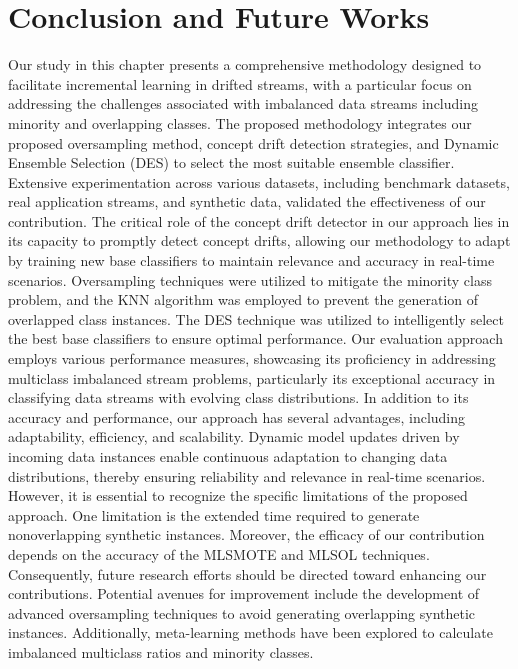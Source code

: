 %
%


\section{Conclusion and Future Works}
\label{sec:4_8_Conclusions}

Our study in this chapter presents a comprehensive methodology designed to facilitate incremental learning in drifted streams, with a particular focus on addressing the challenges associated with imbalanced data streams including minority and overlapping classes. The proposed methodology integrates our proposed oversampling method, concept drift detection strategies, and Dynamic Ensemble Selection (DES) to select the most suitable ensemble classifier. Extensive experimentation across various datasets, including benchmark datasets, real application streams, and synthetic data, validated the effectiveness of our contribution. The critical role of the concept drift detector in our approach lies in its capacity to promptly detect concept drifts, allowing our methodology to adapt by training new base classifiers to maintain relevance and accuracy in real-time scenarios. Oversampling techniques were utilized to mitigate the minority class problem, and the KNN algorithm was employed to prevent the generation of overlapped class instances. The DES technique was utilized to intelligently select the best base classifiers to ensure optimal performance. Our evaluation approach employs various performance measures, showcasing its proficiency in addressing multiclass imbalanced stream problems, particularly its exceptional accuracy in classifying data streams with evolving class distributions. In addition to its accuracy and performance, our approach has several advantages, including adaptability, efficiency, and scalability. Dynamic model updates driven by incoming data instances enable continuous adaptation to changing data distributions, thereby ensuring reliability and relevance in real-time scenarios. However, it is essential to recognize the specific limitations of the proposed approach. One limitation is the extended time required to generate nonoverlapping synthetic instances. Moreover, the efficacy of our contribution depends on the accuracy of the MLSMOTE and MLSOL techniques. Consequently, future research efforts should be directed toward enhancing our contributions. Potential avenues for improvement include the development of advanced oversampling techniques to avoid generating overlapping synthetic instances. Additionally, meta-learning methods have been explored to calculate imbalanced multiclass ratios and minority classes.